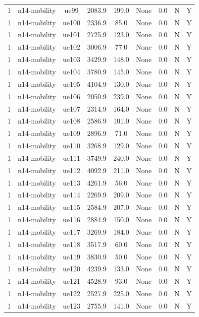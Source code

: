 \begin{table}[ht]
\begin{tabular}{|c|c|c|c|c|c|c|c|c|}
1 & n14-mobility & ue99 & 2083.9 & 199.0 & None & 0.0 & N & Y \\
1 & n14-mobility & ue100 & 2336.9 & 85.0 & None & 0.0 & N & Y \\
1 & n14-mobility & ue101 & 2725.9 & 123.0 & None & 0.0 & N & Y \\
1 & n14-mobility & ue102 & 3006.9 & 77.0 & None & 0.0 & N & Y \\
1 & n14-mobility & ue103 & 3429.9 & 148.0 & None & 0.0 & N & Y \\
1 & n14-mobility & ue104 & 3780.9 & 145.0 & None & 0.0 & N & Y \\
1 & n14-mobility & ue105 & 4104.9 & 130.0 & None & 0.0 & N & Y \\
1 & n14-mobility & ue106 & 2050.9 & 239.0 & None & 0.0 & N & Y \\
1 & n14-mobility & ue107 & 2314.9 & 164.0 & None & 0.0 & N & Y \\
1 & n14-mobility & ue108 & 2586.9 & 101.0 & None & 0.0 & N & Y \\
1 & n14-mobility & ue109 & 2896.9 & 71.0 & None & 0.0 & N & Y \\
1 & n14-mobility & ue110 & 3268.9 & 129.0 & None & 0.0 & N & Y \\
1 & n14-mobility & ue111 & 3749.9 & 240.0 & None & 0.0 & N & Y \\
1 & n14-mobility & ue112 & 4092.9 & 211.0 & None & 0.0 & N & Y \\
1 & n14-mobility & ue113 & 4261.9 & 56.0 & None & 0.0 & N & Y \\
1 & n14-mobility & ue114 & 2269.9 & 209.0 & None & 0.0 & N & Y \\
1 & n14-mobility & ue115 & 2584.9 & 207.0 & None & 0.0 & N & Y \\
1 & n14-mobility & ue116 & 2884.9 & 150.0 & None & 0.0 & N & Y \\
1 & n14-mobility & ue117 & 3269.9 & 184.0 & None & 0.0 & N & Y \\
1 & n14-mobility & ue118 & 3517.9 & 60.0 & None & 0.0 & N & Y \\
1 & n14-mobility & ue119 & 3830.9 & 50.0 & None & 0.0 & N & Y \\
1 & n14-mobility & ue120 & 4239.9 & 133.0 & None & 0.0 & N & Y \\
1 & n14-mobility & ue121 & 4528.9 & 93.0 & None & 0.0 & N & Y \\
1 & n14-mobility & ue122 & 2527.9 & 225.0 & None & 0.0 & N & Y \\
1 & n14-mobility & ue123 & 2755.9 & 141.0 & None & 0.0 & N & Y \\

\end{tabular}
\end{table}
